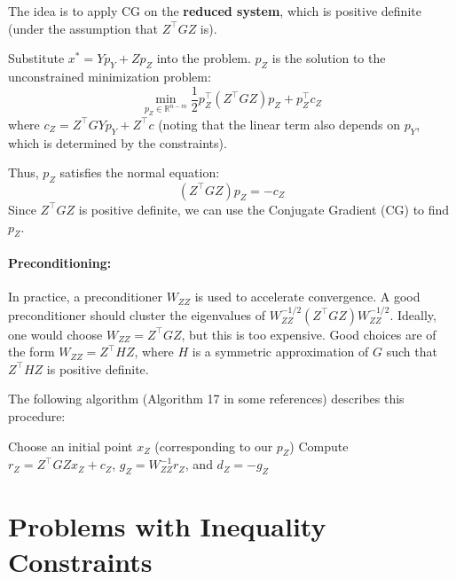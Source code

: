 The idea is to apply CG on the \textbf{reduced system}, which is positive definite (under the assumption that $Z^\top G Z$ is).

Substitute $x^* = Y p_Y + Z p_Z$ into the problem.
$p_Z$ is the solution to the unconstrained minimization problem:
\begin{equation}
    \min_{p_Z \in \mathbb{R}^{n-m}} \frac{1}{2} p_Z^\top (Z^\top G Z) p_Z + p_Z^\top c_Z
\end{equation}
where $c_Z = Z^\top G Y p_Y + Z^\top c$ (noting that the linear term also depends on $p_Y$, which is determined by the constraints).

Thus, $p_Z$ satisfies the normal equation:
\begin{equation}
    (Z^\top G Z) p_Z = -c_Z
\end{equation}
Since $Z^\top G Z$ is positive definite, we can use the Conjugate Gradient (CG) to find $p_Z$.

\paragraph{Preconditioning:}
In practice, a preconditioner $W_{ZZ}$ is used to accelerate convergence. A good preconditioner should cluster the eigenvalues of $W_{ZZ}^{-1/2} (Z^\top G Z) W_{ZZ}^{-1/2}$.
Ideally, one would choose $W_{ZZ} = Z^\top G Z$, but this is too expensive.
Good choices are of the form $W_{ZZ} = Z^\top H Z$, where $H$ is a symmetric approximation of $G$ such that $Z^\top H Z$ is positive definite.

The following algorithm (Algorithm 17 in some references) describes this procedure:

\begin{algorithm}[H]
    \caption{Preconditioned Conjugate Gradient for reduced systems}
    \SetAlgoLined
    Choose an initial point $x_Z$ (corresponding to our $p_Z$)\;
    Compute $r_Z=Z^\top GZx_Z + c_Z$, $g_Z=W_{ZZ}^{-1}r_Z$, and $d_Z=-g_Z$\;
\end{algorithm}

\section{Problems with Inequality Constraints}

